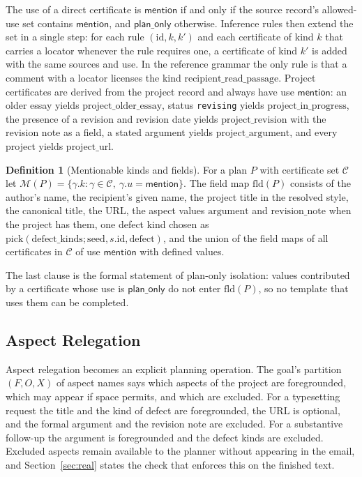 \documentclass[11pt]{article}
\theoremstyle{definition}
\newtheorem{definition}[theorem]{Definition}
\theoremstyle{remark}
\newcommand{\mention}{\mathsf{mention}}
\newcommand{\planonly}{\mathsf{plan\_only}}
\newcommand{\Mset}{\mathcal{M}}
\newcommand{\code}[1]{\texttt{#1}}
\begin{document}
The use of a direct certificate is $\mention$ if and only if the source record's allowed-use set contains $\mention$, and $\planonly$ otherwise. Inference rules then extend the set in a single step: for each rule $(\mathrm{id},k,k')$ and each certificate of kind $k$ that carries a locator whenever the rule requires one, a certificate of kind $k'$ is added with the same sources and use. In the reference grammar the only rule is that a comment with a locator licenses the kind $\text{recipient\_read\_passage}$. Project certificates are derived from the project record and always have use $\mention$: an older essay yields $\text{project\_older\_essay}$, status \code{revising} yields $\text{project\_in\_progress}$, the presence of a revision and revision date yields $\text{project\_revision}$ with the revision note as a field, a stated argument yields $\text{project\_argument}$, and every project yields $\text{project\_url}$.

\begin{definition}[Mentionable kinds and fields]\label{def:mentionable}
For a plan $P$ with certificate set $\mathcal{C}$ let $\Mset(P)=\{\gamma.k:\gamma\in\mathcal{C},\ \gamma.u=\mention\}$. The field map $\mathrm{fld}(P)$ consists of the author's name, the recipient's given name, the project title in the resolved style, the canonical title, the URL, the aspect values $\mathrm{argument}$ and $\mathrm{revision\_note}$ when the project has them, one defect kind chosen as $\mathrm{pick}(\mathrm{defect\_kinds};\mathrm{seed},s.\mathrm{id},\text{defect})$, and the union of the field maps of all certificates in $\mathcal{C}$ of use $\mention$ with defined values.
\end{definition}

The last clause is the formal statement of plan-only isolation: values contributed by a certificate whose use is $\planonly$ do not enter $\mathrm{fld}(P)$, so no template that uses them can be completed.

\subsection{Aspect Relegation}

Aspect relegation becomes an explicit planning operation. The goal's partition $(F,O,X)$ of aspect names says which aspects of the project are foregrounded, which may appear if space permits, and which are excluded. For a typesetting request the title and the kind of defect are foregrounded, the URL is optional, and the formal argument and the revision note are excluded. For a substantive follow-up the argument is foregrounded and the defect kinds are excluded. Excluded aspects remain available to the planner without appearing in the email, and Section~\ref{sec:real} states the check that enforces this on the finished text.
\end{document}
